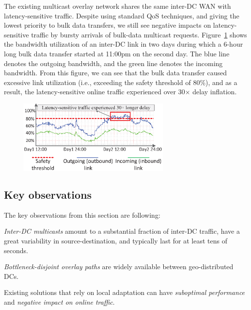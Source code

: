 The existing multicast overlay network shares the same inter-DC WAN
with latency-sensitive traffic. Despite using standard QoS techniques, 
and giving the lowest priority to bulk data transfers, we still see 
negative impacts on latency-sensitive traffic by bursty arrivals of 
bulk-data multicast requests. Figure~\ref{fig:lesson2} shows the 
bandwidth utilization of an inter-DC link in two days during which a 
6-hour long bulk data transfer started at 11:00pm on the second day. 
The blue line denotes the outgoing bandwidth, and the green line 
denotes the incoming bandwidth. From this figure, we can see that the
bulk data transfer caused excessive link utilization (i.e., exceeding
the safety threshold of 80\%), and as a result, the latency-sensitive 
online traffic experienced over 30$\times$ delay inflation.



\begin{figure}[t!]
        \center
        \includegraphics[width=3in]{images/nj02-M2A_0212-0216_v3.eps}
        \label{fig:lesson2}
\vspace{-0.1in}
\end{figure}

\subsection{Key observations}
The key observations from this section are following:
\begin{packeditemize}
\item {\em Inter-DC multicasts} amount to a substantial fraction of 
inter-DC traffic, have a great variability in source-destination, and 
typically last for at least tens of seconds.
\item {\em Bottleneck-disjoint overlay paths} are widely available
between geo-distributed DCs.
\item Existing solutions that rely on local adaptation can have 
{\em suboptimal performance} and {\em negative impact on
online traffic}.
\end{packeditemize}

